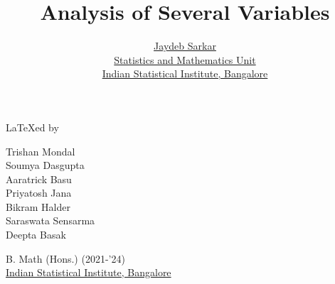 \documentclass{report}
\title{\Huge\sffamily Analysis of Several Variables}
\author{{\LARGE\sffamily \href{https://www.isibang.ac.in/~jay/}{Jaydeb Sarkar}} \\[0.5cm]
  \href{https://www.isibang.ac.in/~statmath}{Statistics and Mathematics Unit} \\
  \href{https://www.isibang.ac.in}{Indian Statistical Institute, Bangalore}}
\date{}
\begin{document}



\maketitle

{\vspace*{\fill}\centering
  {\LARGE \LaTeX ed by}
  \vspace{0.5cm}
  \begin{center}
    \large
    Trishan Mondal \\
    Soumya Dasgupta \\
    Aaratrick Basu \\
    Priyatosh Jana \\
    Bikram Halder \\
    Saraswata Sensarma \\
    Deepta Basak
  \end{center}
  \vspace{0.5cm}
  \begin{center}
    B. Math (Hons.) (2021-'24) \\
    \href{https://www.isibang.ac.in}{Indian Statistical Institute, Bangalore}
  \end{center}
  \vspace*{\fill}}

\tableofcontents



























\end{document}
